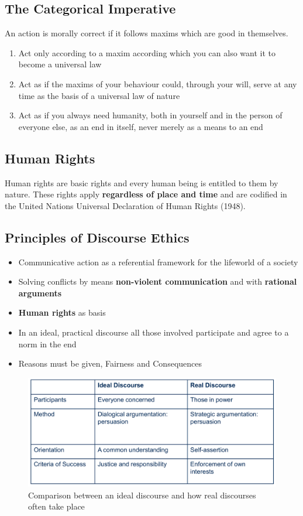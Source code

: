 \documentclass[11pt]{article}
\theoremstyle{definition}
\begin{document}
\subsection{The Categorical Imperative}
An action is morally correct if it follows maxims which are good in themselves.
\begin{enumerate}
	\item Act only according to a maxim according which you can also want it to become a universal law
	\item Act as if the maxims of your behaviour could, through your will, serve at any time as the basis of a universal law of nature
	\item Act as if you always need humanity, both in yourself and in the person of everyone else, as an end in itself, never merely as a means to an end
\end{enumerate}

\subsection{Human Rights}
Human rights are basic rights and every human being is entitled to them by nature. These rights apply \textbf{regardless of place and time} and are codified in the United Nations Universal Declaration of Human Rights (1948).

\subsection{Principles of Discourse Ethics}
\begin{itemize}
	\item Communicative action as a referential framework for the lifeworld of a society
	\item Solving conflicts by means \textbf{non-violent communication} and with \textbf{rational arguments}
	\item \textbf{Human rights} as basis
	\item In an ideal, practical discourse all those involved participate and agree to a norm in the end
	\item Reasons must be given, Fairness and Consequences
\end{itemize}

\begin{figure}[tbh]
	\centering
	\includegraphics[width=0.8\linewidth]{img/discourse_comparison}
	\caption{Comparison between an ideal discourse and how real discourses often take place}
	\label{fig:discoursecomparison}
\end{figure}
\end{document}
